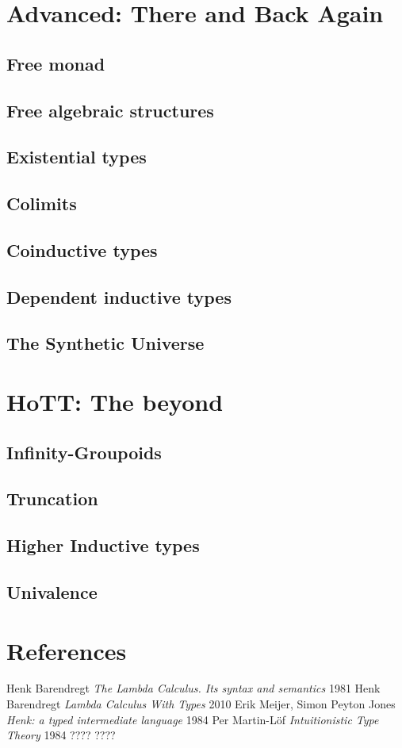 \documentclass[11pt,oneside]{article}
\begin{document}
\section{Advanced: There and Back Again}
\subsection{Free monad}
\subsection{Free algebraic structures}
\subsection{Existential types}
\subsection{Colimits}
\subsection{Coinductive types}
\subsection{Dependent inductive types}
\subsection{The Synthetic Universe}

\section{HoTT: The beyond}
\subsection{Infinity-Groupoids}
\subsection{Truncation}
\subsection{Higher Inductive types}
\subsection{Univalence}

\newpage
\section{References}
\begin{thebibliography}{9}

      Henk Barendregt \textit{The Lambda Calculus. Its syntax and semantics} 1981
      Henk Barendregt \textit{Lambda Calculus With Types} 2010
       Erik Meijer, Simon Peyton Jones \textit{Henk: a typed intermediate language} 1984
        Per Martin-Löf \textit{Intuitionistic Type Theory} 1984
 ????
 ????

\end{thebibliography}
\end{document}

